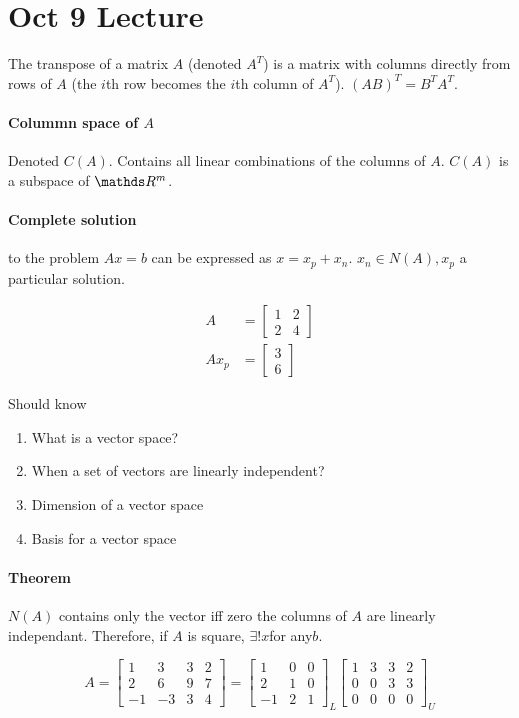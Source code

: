 \section{Oct 9 Lecture}

The transpose of a matrix $A$ (denoted $A^T$) is a matrix with columns directly from rows of $A$ (the $i$th row becomes the $i$th column of $A^T$). $(AB)^T = B^T A^T$.

\paragraph{Colummn space of $A$} Denoted $C(A)$. Contains all linear combinations of the columns of $A$. $C(A)$ is a subspace of $\bbR^m$.

\paragraph{Complete solution} to the problem $Ax=b$ can be expressed as $x=x_p + x_n$. $x_n \in N(A), x_p$ a particular solution.

\begin{align*}
  A &= \begin{bmatrix}
    1 & 2 \\ 2 & 4
  \end{bmatrix} \\
  A x_p &= \begin{bmatrix}
    3 \\ 6
  \end{bmatrix}
\end{align*}

Should know
\begin{enumerate}
  \item What is a vector space?
  \item When a set of vectors are linearly independent?
  \item Dimension of a vector space
  \item Basis for a vector space
\end{enumerate}

\paragraph{Theorem} $N(A)$ contains only the vector iff zero the columns of $A$ are linearly independant. Therefore, if $A$ is square, $\exists! x $for any$ b$.

\[
  A = \begin{bmatrix}
    1 & 3 & 3 & 2 \\
    2 & 6 & 9 & 7 \\
    -1 & -3 & 3 & 4
  \end{bmatrix} =
  \begin{bmatrix}
    1 & 0 & 0 \\
    2 & 1 & 0 \\
    -1 & 2 & 1 
  \end{bmatrix}_L
  \begin{bmatrix}
    1 & 3 & 3 & 2 \\
    0 & 0 & 3 & 3 \\
    0 & 0 & 0 & 0
  \end{bmatrix}_U
\]

